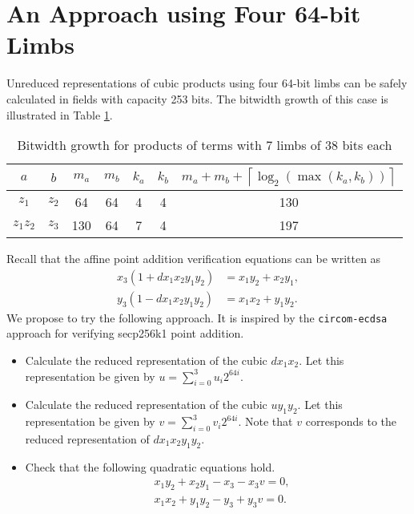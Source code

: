 \documentclass[a4paper, 12pt]{article}
\begin{document}
\newpage
\section{An Approach using Four 64-bit Limbs}%
\label{sec:an_approach_using_four_64_bit_limbs}
Unreduced representations of cubic products using four 64-bit limbs can be safely calculated in fields with capacity 253 bits. The bitwidth growth of this case is illustrated in Table \ref{tab:limb64}.
\begin{table}[h]
  \centering
  \begin{tabular}{c|c|c|c|c|c|c}
    $a$ & $b$ & $m_a$ & $m_b$ & $k_a$ & $k_b$ & $m_a+m_b+\left\lceil \log_2 \left( \max\left( k_a, k_b \right) \right) \right\rceil$ \\ \hline
    $z_1$ & $z_2$ & 64 & 64 & 4 & 4 & 130 \\ \hline
    $z_1z_2$ & $z_3$ & 130 & 64 & 7 & 4 & 197 \\ \hline
  \end{tabular}
  \caption{Bitwidth growth for products of terms with 7 limbs of 38 bits each}
  \label{tab:limb64}
\end{table}

Recall that the affine point addition verification equations can be written as
\begin{align}
  x_3(1+dx_1x_2y_1y_2) &= x_1y_2 + x_2y_1,\\
  y_3(1-dx_1x_2y_1y_2) &= x_1x_2 + y_1y_2.
  \label{eqn:additionAffineVerification}
\end{align}
We propose to try the following approach. It is inspired by the \texttt{circom-ecdsa} approach for verifying secp256k1 point addition.
\begin{itemize}
  \item Calculate the reduced representation of the cubic $dx_1x_2$. Let this representation be given by $u = \sum_{i=0}^{3}u_i 2^{64i}$.
  \item Calculate the reduced representation of the cubic $uy_1y_2$. Let this representation be given by $v = \sum_{i=0}^{3}v_i 2^{64i}$. Note that $v$ corresponds to the reduced representation of $dx_1x_2y_1y_2$.
  \item Check that the following quadratic equations hold.
    \begin{align*}
      & x_1y_2 + x_2y_1 -x_3 - x_3 v = 0,\\
      & x_1x_2 + y_1y_2 -y_3 + y_3 v = 0.
    \end{align*}
\end{itemize}
\end{document}

